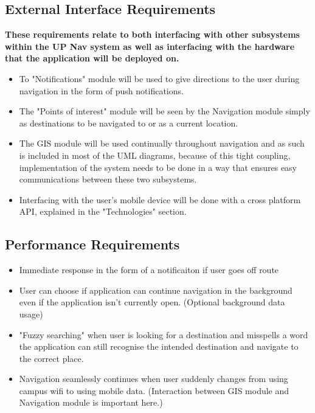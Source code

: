 

%	
%


	
	\subsection{External Interface Requirements}
	 \textbf{ These requirements relate to both interfacing with other subsystems within the UP Nav system as well as interfacing with the hardware that the application will be deployed on.}
	\begin{itemize}
		\small
		\item To "Notifications" module will be used to give directions to the user during navigation in the form of push notifications.
		\item The "Points of interest" module will be seen by the Navigation module simply as destinations to be navigated to or as a current location.
		\item The GIS module will be used continually throughout navigation and as such is included in most of the UML diagrams, because of this tight coupling, implementation of the system needs to be done in a way that ensures easy communications between these two subsystems.
		\item Interfacing with the user's mobile device will be done with a cross platform API, explained in the "Technologies" section.
	\end{itemize}
	
	\subsection{Performance Requirements}
	\begin{itemize}
		\small
		\item Immediate response in the form of a notificaiton if user goes off route
		\item User can choose if application can continue navigation in the background even if the application isn't currently open. (Optional background data usage)
		\item "Fuzzy searching" when user is looking for a destination and misspells a word the application can still recognise the intended destination and navigate to the correct place.
		\item Navigation seamlessly continues when user suddenly changes from using campus wifi to using mobile data. (Interaction between GIS module and Navigation module is important here.)
	\end{itemize}
	
